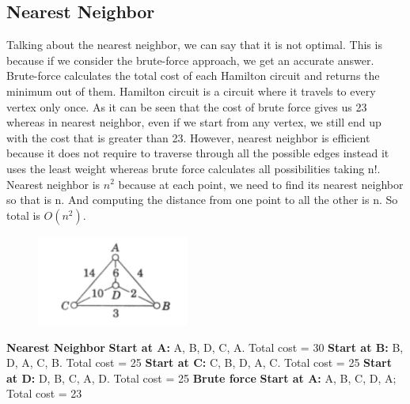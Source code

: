 \documentclass[11pt]{article}
\begin{document}
\subsection{Nearest Neighbor}
Talking about the nearest neighbor, we can say that it is not optimal. This is because if we consider the brute-force approach, we get an accurate answer. Brute-force calculates the total cost of each Hamilton circuit and returns the minimum out of them. Hamilton circuit is a circuit where it travels to every vertex only once. As it can be seen that the cost of brute force gives us 23 whereas in nearest neighbor, even if we start from any vertex, we still end up with the cost that is greater than 23. However, nearest neighbor is efficient because it does not require to traverse through all the possible edges instead it uses the least weight whereas brute force calculates all possibilities taking n!. Nearest neighbor is $n^2$ because at each point, we need to find its nearest neighbor so that is n. And computing the distance from one point to all the other is n. So total is $O(n^2)$. \newline
\begin{figure}[htp]
    \centering
    \includegraphics[width=5cm]{Graph.PNG}
    \label{fig:galaxy}
\end{figure} \newline
\textbf{Nearest Neighbor} \newline
\textbf{Start at A:} A, B, D, C, A. Total cost = 30 \newline
\textbf{Start at B:} B, D, A, C, B. Total cost = 25 \newline
\textbf{Start at C:} C, B, D, A, C. Total cost = 25 \newline
\textbf{Start at D:} D, B, C, A, D. Total cost = 25 \newline \newline
\textbf{Brute force} \newline
\textbf{Start at A:} A, B, C, D, A; Total cost = 23
\end{document}
